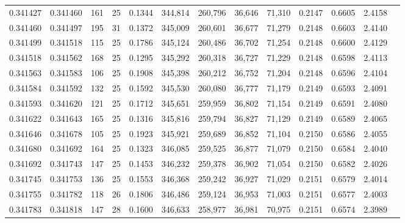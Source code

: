 \begin{tabular}{rrrrrrrrrrrrr}
0.341427 & 0.341460 &   161 &  25 &                                     0.1344 & 344,814 & 260,796 &  36,646 &  71,310 & 0.2147 & 0.6605 & 2.4158 \\
0.341460 & 0.341497 &   195 &  31 &                                     0.1372 & 345,009 & 260,601 &  36,677 &  71,279 & 0.2148 & 0.6603 & 2.4140 \\
0.341499 & 0.341518 &   115 &  25 &                                     0.1786 & 345,124 & 260,486 &  36,702 &  71,254 & 0.2148 & 0.6600 & 2.4129 \\
0.341518 & 0.341562 &   168 &  25 &                                     0.1295 & 345,292 & 260,318 &  36,727 &  71,229 & 0.2148 & 0.6598 & 2.4113 \\
0.341563 & 0.341583 &   106 &  25 &                                     0.1908 & 345,398 & 260,212 &  36,752 &  71,204 & 0.2148 & 0.6596 & 2.4104 \\
0.341584 & 0.341592 &   132 &  25 &                                     0.1592 & 345,530 & 260,080 &  36,777 &  71,179 & 0.2149 & 0.6593 & 2.4091 \\
0.341593 & 0.341620 &   121 &  25 &                                     0.1712 & 345,651 & 259,959 &  36,802 &  71,154 & 0.2149 & 0.6591 & 2.4080 \\
0.341622 & 0.341643 &   165 &  25 &                                     0.1316 & 345,816 & 259,794 &  36,827 &  71,129 & 0.2149 & 0.6589 & 2.4065 \\
0.341646 & 0.341678 &   105 &  25 &                                     0.1923 & 345,921 & 259,689 &  36,852 &  71,104 & 0.2150 & 0.6586 & 2.4055 \\
0.341680 & 0.341692 &   164 &  25 &                                     0.1323 & 346,085 & 259,525 &  36,877 &  71,079 & 0.2150 & 0.6584 & 2.4040 \\
0.341692 & 0.341743 &   147 &  25 &                                     0.1453 & 346,232 & 259,378 &  36,902 &  71,054 & 0.2150 & 0.6582 & 2.4026 \\
0.341745 & 0.341753 &   136 &  25 &                                     0.1553 & 346,368 & 259,242 &  36,927 &  71,029 & 0.2151 & 0.6579 & 2.4014 \\
0.341755 & 0.341782 &   118 &  26 &                                     0.1806 & 346,486 & 259,124 &  36,953 &  71,003 & 0.2151 & 0.6577 & 2.4003 \\
0.341783 & 0.341818 &   147 &  28 &                                     0.1600 & 346,633 & 258,977 &  36,981 &  70,975 & 0.2151 & 0.6574 & 2.3989 \\

\end{tabular}

